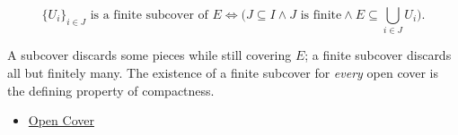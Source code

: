 \begin{remark*}
\[
\{U_i\}_{i\in J} \text{ is a finite subcover of } E
\Longleftrightarrow
\bigl(J\subseteq I \land J \text{ is finite} \land E\subseteq\textstyle\bigcup_{i\in J}U_i\bigr).
\]
\end{remark*}
\begin{remark*}[Interpretation]
A subcover discards some pieces while still covering $E$; a finite subcover discards all but finitely many. The existence of a finite subcover for \emph{every} open cover is the defining property of compactness.
\end{remark*}
\begin{dependencies}
\begin{itemize}
  \item \hyperref[def:real-open-cover]{Open Cover}
\end{itemize}
\end{dependencies}
